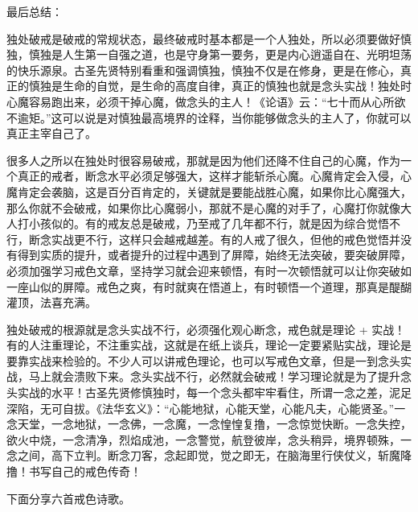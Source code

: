 最后总结：

独处破戒是破戒的常规状态，最终破戒时基本都是一个人独处，所以必须要做好慎独，慎独是人生第一自强之道，也是守身第一要务，更是内心逍遥自在、光明坦荡的快乐源泉。古圣先贤特别看重和强调慎独，慎独不仅是在修身，更是在修心，真正的慎独是生命的自觉，是生命的高度自律，真正的慎独也就是念头实战！独处时心魔容易跑出来，必须干掉心魔，做念头的主人！《论语》云：“七十而从心所欲不逾矩。”这可以说是对慎独最高境界的诠释，当你能够做念头的主人了，你就可以真正主宰自己了。

很多人之所以在独处时很容易破戒，那就是因为他们还降不住自己的心魔，作为一个真正的戒者，断念水平必须足够强大，这样才能斩杀心魔。心魔肯定会入侵，心魔肯定会袭脑，这是百分百肯定的，关键就是要能战胜心魔，如果你比心魔强大，那么你就不会破戒，如果你比心魔弱小，那就不是心魔的对手了，心魔打你就像大人打小孩似的。有的戒友总是破戒，乃至戒了几年都不行，就是因为综合觉悟不行，断念实战更不行，这样只会越戒越差。有的人戒了很久，但他的戒色觉悟并没有得到实质的提升，或者提升的过程中遇到了屏障，始终无法突破，要突破屏障，必须加强学习戒色文章，坚持学习就会迎来顿悟，有时一次顿悟就可以让你突破如一座山似的屏障。戒色之爽，有时就爽在悟道上，有时顿悟一个道理，那真是醍醐灌顶，法喜充满。

独处破戒的根源就是念头实战不行，必须强化观心断念，戒色就是理论 + 实战！有的人注重理论，不注重实战，这就是在纸上谈兵，理论一定要紧贴实战，理论是要靠实战来检验的。不少人可以讲戒色理论，也可以写戒色文章，但是一到念头实战，马上就会溃败下来。念头实战不行，必然就会破戒！学习理论就是为了提升念头实战的水平！古圣先贤修慎独时，每一个念头都牢牢看住，所谓一念之差，泥足深陷，无可自拔。《法华玄义》：“心能地狱，心能天堂，心能凡夫，心能贤圣。”一念天堂，一念地狱，一念佛，一念魔，一念惶惶复撸，一念惊觉快断。一念失控，欲火中烧，一念清净，烈焰成池，一念警觉，航登彼岸，念头稍异，境界顿殊，一念之间，高下立判。断念刀客，念起即觉，觉之即无，在脑海里行侠仗义，斩魔降撸！书写自己的戒色传奇！

下面分享六首戒色诗歌。

